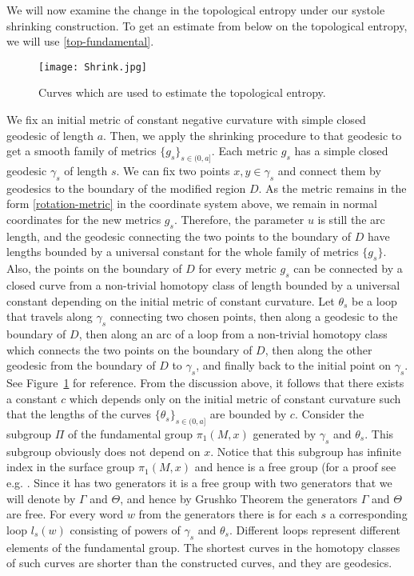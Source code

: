 \documentclass[12pt]{article}
\numberwithin{equation}{section}
\theoremstyle{definition}
\begin{document}
We will now examine the change in the topological entropy under our systole shrinking construction. To get an estimate from below on the topological entropy, we will use \eqref{top-fundamental}.

\begin{figure}[H]
      \centering
      \texttt{[image: Shrink.jpg]}
      \caption{Curves which are used to estimate the topological entropy.}
      \label{shrink}
      \end{figure}

We fix an initial metric of constant negative curvature with simple closed geodesic of length $a$. Then, we apply the shrinking procedure to that geodesic to get a smooth family of metrics $\{g_s\}_{s\in(0,a]}$. Each metric $g_s$ has a simple closed geodesic $\gamma_s$ of length $s$. We can fix two points  $x,y\in\gamma_s$ and connect them by geodesics to the boundary of the modified region $D$. As the metric remains in the form \eqref{rotation-metric} in the  coordinate system above, we remain in normal coordinates for the new metrics $g_s$. Therefore, the parameter $u$ is still the arc length, and the geodesic connecting the two points to the boundary of $D$ have lengths bounded by a universal constant for the whole family of metrics $\{g_s\}$. Also, the points on the boundary of $D$ for every metric $g_s$ can be connected by a closed curve from a non-trivial homotopy class of length bounded by a universal constant depending on the initial metric of constant curvature. Let $\theta_s$ be a loop that travels along $\gamma_s$ connecting two chosen points, then along a geodesic to the boundary of $D$, then along an arc of a loop from a non-trivial homotopy class which connects the two points on the boundary of $D$, then along the other geodesic from the boundary of $D$ to $\gamma_s$, and finally back to the initial point on $\gamma_s$. See Figure~\ref{shrink} for reference. From the discussion above, it follows that there exists a constant $c$ which depends only on the initial metric of constant curvature such that the lengths of the curves $\{\theta_s\}_{s\in(0,a]}$ are bounded by $c$.  Consider the subgroup $\Pi$ of the fundamental group $\pi_1(M,x)$ generated by $\gamma_s$ and $\theta_s$. This subgroup obviously does not depend on $x$.  Notice that this subgroup has infinite index in the surface group $\pi_1(M,x)$ and hence is a free group (for a proof see e.g. \cite{blog}. Since it has two generators it is a free group with two generators  that we will denote by $\Gamma$ and $\Theta$, and hence by Grushko Theorem \cite{Gr40} the generators $\Gamma$ and $\Theta$ are free.  For every word $w$  from  the generators there is  for each $s$ a  corresponding loop  $l_s(w)$ consisting of powers of $\gamma_s$ and $\theta_s$. Different  loops represent different elements of the fundamental group. The shortest curves in the homotopy classes of such curves are shorter than the constructed curves, and they are geodesics. 
\end{document}
